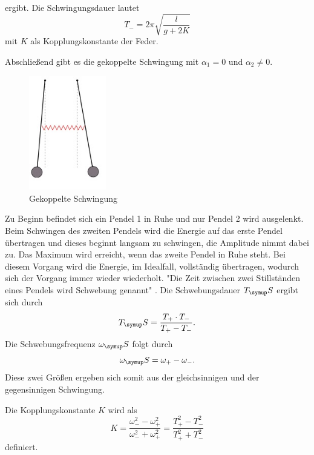 ergibt. Die Schwingungsdauer lautet
\begin{equation}
  T_-= 2\pi\sqrt{\frac{l}{g+2K}}
\end{equation}
mit $K$ als Kopplungskonstante der Feder.
\par
Abschließend gibt es die gekoppelte Schwingung mit $\alpha_1 = 0$ und $\alpha_2 ≠ 0$.
\begin{figure}
  \centering
  \includegraphics[width= 0.3\textwidth]{bilder/gekoppelte.jpg}
  \caption{Gekoppelte Schwingung\,\cite{106}}
\end{figure}
Zu Beginn befindet sich ein Pendel 1 in Ruhe und nur Pendel 2 wird ausgelenkt.
Beim Schwingen des zweiten Pendels wird die Energie auf das erste Pendel übertragen
und dieses beginnt langsam zu schwingen, die Amplitude nimmt dabei zu. Das Maximum wird
erreicht, wenn das zweite Pendel in Ruhe steht. Bei diesem Vorgang wird die Energie,
im Idealfall, vollständig übertragen, wodurch sich der Vorgang immer wieder wiederholt.
"Die Zeit zwischen zwei Stillständen eines Pendels wird Schwebung genannt" \cite{106}.
Die Schwebungsdauer $T_\su{S}$ ergibt sich durch
\begin{equation}
  T_\su{S} = \frac{T_+ \cdot T_-}{T_+ - T_-}.
\end{equation}
Die Schwebungsfrequenz $\omega_\su{S}$ folgt durch
\begin{equation}
  \omega_\su{S} = \omega_+ - \omega_-  .
\end{equation}
Diese zwei Größen ergeben sich somit aus der gleichsinnigen und der gegensinnigen
Schwingung.

Die Kopplungskonstante $K$ wird als
\begin{equation}
  K = \frac{\omega_-^2 - \omega_+^2}{\omega_-^2 + \omega_+^2} = \frac{T_+^2 - T_-^2}{T_+^2 + T_-^2}
\end{equation}
definiert.
